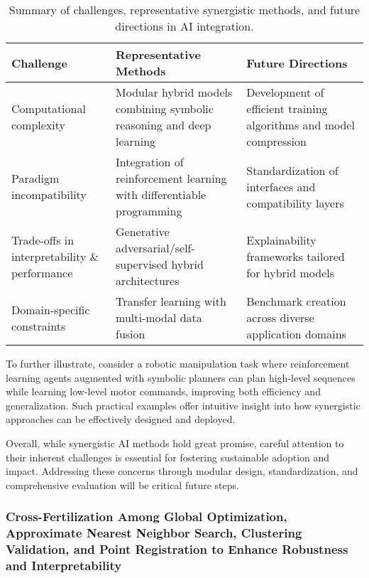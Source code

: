\documentclass[sigconf]{acmart}
\begin{document}
\begin{table*}[htbp]
\centering
\caption{Summary of challenges, representative synergistic methods, and future directions in AI integration.}
\label{tab:synergy_summary}
\begin{adjustbox}{max width=\textwidth}
\begin{tabular}{@{}lll@{}}
\toprule
Challenge & Representative Methods & Future Directions \\ \midrule
Computational complexity & Modular hybrid models combining symbolic reasoning and deep learning & Development of efficient training algorithms and model compression \\
Paradigm incompatibility & Integration of reinforcement learning with differentiable programming & Standardization of interfaces and compatibility layers \\
Trade-offs in interpretability \& performance & Generative adversarial/self-supervised hybrid architectures & Explainability frameworks tailored for hybrid models \\
Domain-specific constraints & Transfer learning with multi-modal data fusion & Benchmark creation across diverse application domains \\ \bottomrule
\end{tabular}
\end{adjustbox}
\end{table*}

To further illustrate, consider a robotic manipulation task where reinforcement learning agents augmented with symbolic planners can plan high-level sequences while learning low-level motor commands, improving both efficiency and generalization. Such practical examples offer intuitive insight into how synergistic approaches can be effectively designed and deployed.

Overall, while synergistic AI methods hold great promise, careful attention to their inherent challenges is essential for fostering sustainable adoption and impact. Addressing these concerns through modular design, standardization, and comprehensive evaluation will be critical future steps.

\subsubsection{Cross-Fertilization Among Global Optimization, Approximate Nearest Neighbor Search, Clustering Validation, and Point Registration to Enhance Robustness and Interpretability}
\end{document}
